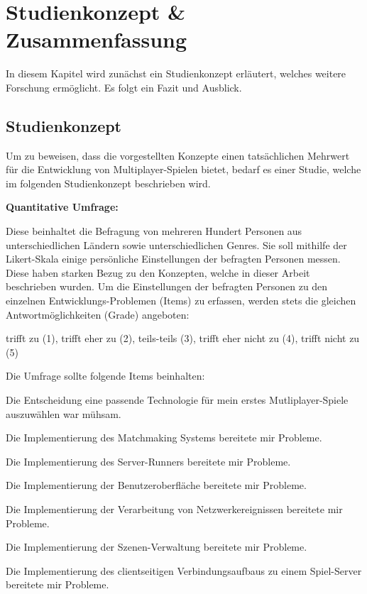 \chapter{Studienkonzept \& Zusammenfassung }
\label{sec:zusammenfassung}

In diesem Kapitel wird zunächst ein Studienkonzept erläutert, welches weitere Forschung ermöglicht. Es folgt ein Fazit und Ausblick.

\section{Studienkonzept}
\label{studienkonzept}

Um zu beweisen, dass die vorgestellten Konzepte einen tatsächlichen Mehrwert für die Entwicklung von Multiplayer-Spielen bietet, bedarf es einer Studie, welche im folgenden Studienkonzept beschrieben wird.

\textbf{Quantitative Umfrage:}

Diese beinhaltet die Befragung von mehreren Hundert Personen aus unterschiedlichen Ländern sowie unterschiedlichen Genres. Sie soll mithilfe der Likert-Skala \cite{Wikipedia.2022d} einige persönliche Einstellungen der befragten Personen messen. Diese haben starken Bezug zu den Konzepten, welche in dieser Arbeit beschrieben wurden. Um die Einstellungen der befragten Personen zu den einzelnen Entwicklungs-Problemen (Items) zu erfassen, werden stets die gleichen Antwortmöglichkeiten (Grade) angeboten:

trifft zu (1), trifft eher zu (2), teils-teils (3), trifft eher nicht zu (4), trifft nicht zu (5)

Die Umfrage sollte folgende Items beinhalten:

Die Entscheidung eine passende Technologie für mein erstes Mutliplayer-Spiele auszuwählen war mühsam.

Die Implementierung des Matchmaking Systems bereitete mir Probleme.

Die Implementierung des Server-Runners bereitete mir Probleme.

Die Implementierung der Benutzeroberfläche bereitete mir Probleme.

Die Implementierung der Verarbeitung von Netzwerkereignissen bereitete mir Probleme.

Die Implementierung der Szenen-Verwaltung bereitete mir Probleme.

Die Implementierung des clientseitigen Verbindungsaufbaus zu einem Spiel-Server bereitete mir Probleme.

